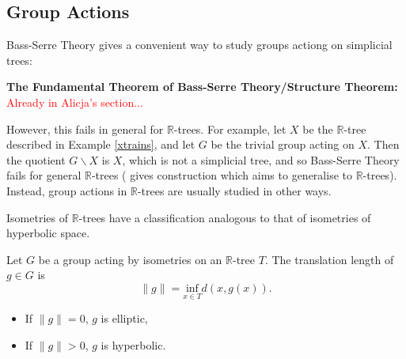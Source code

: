 \subsection{Group Actions}
Bass-Serre Theory gives a convenient way to study groups actiong on simplicial trees:
\begin{theorem}
    \textbf{The Fundamental Theorem of Bass-Serre Theory/Structure Theorem:} \textcolor{red}{Already in Alicja's section...}
\end{theorem}

However, this fails in general for $\mathbb{R}$-trees. For example, let $X$ be the $\mathbb{R}$-tree described in Example \ref{xtrains}, and let $G$ be the trivial group acting on $X$. Then the quotient $G\backslash X$ is $X$, which is not a simplicial tree, and so Bass-Serre Theory fails for general $\mathbb{R}$-trees (\cite{Levit_rtrees} gives construction which aims to generalise to $\mathbb{R}$-trees). Instead, group actions in $\mathbb{R}$-trees are usually studied in other ways.

Isometries of $\mathbb{R}$-trees have a classification analogous to that of isometries of hyperbolic space. 
\begin{definition}
    Let $G$ be a group acting by isometries on an $\mathbb{R}$-tree $T$. The \textnormal{translation length} of $g\in G$ is \[\lVert g\rVert=\underset{x\in T}{\text{inf}}d(x,g(x)).\]
    \begin{itemize}
        \item If $\lVert g\rVert=0$, $g$ is \textnormal{elliptic},
        \item If $\lVert g\rVert>0$, $g$ is \textnormal{hyperbolic}.
    \end{itemize}
\end{definition}

